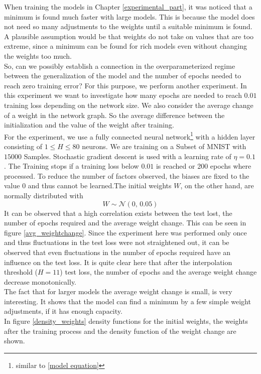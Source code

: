 When training the models in Chapter \ref{experimental_part}, it was noticed that a minimum is found much faster with large models.  This is because the model does not need so many adjustments to the weights until a suitable minimum is found. A plausible assumption would be that weights do not take on values that are too extreme, since a minimum can be found for rich models even without changing the weights too much. \\
So, can we possibly establish a connection in the overparameterized regime between the generalization of the model and the number of epochs needed to reach zero training error? For this purpose, we perform another experiment. In this experiment we want to investigate how many epochs are needed to reach $0.01$ training loss depending on the network size. We also consider the average change of a weight in the network graph. So the average difference between the initialization and the value of the weight after training. \\
For the experiment, we use a fully connected neural network\footnote{similar to \ref{model equation}} with a hidden layer consisting of $1 \leq H \leq 80$ neurons. We are  training on a Subset of MNIST with $15000$ Samples. Stochastic gradient descent is used with a learning rate of $\eta = 0.1$.
The Training stops if a training loss below $0.01$ is reached or 200 epochs where processed. To reduce the number of factors observed, the biases are fixed to the value $0$ and thus cannot be learned.The initial weights $W$, on the other hand, are normally distributed with
$$
W \sim \mathcal{N}(0,\,0.05)
$$
It can be observed that a high correlation exists between the test lost, the number of epochs required and the average weight change. This can be seen in figure \ref{avg_weightchange}. Since the experiment here was performed only once and thus fluctuations in the test loss were not straightened out, it can be observed that even fluctuations in the number of epochs required have an influence on the test loss. It is quite clear here that after the interpolation threshold ($H = 11$) test loss, the number of epochs and the average weight change decrease monotonically.  \\
The fact that for larger models the average weight change is small, is very interesting. It shows that the model can find a minimum by a few simple weight adjustments, if it has enough capacity. \\
In figure \ref{density_weights} density functions for the initial weights, the weights after the training process and the density function of the weight change are shown.
